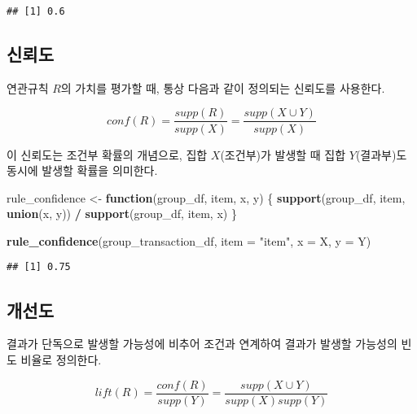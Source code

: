 \documentclass[]{book}
\newenvironment{Shaded}{\begin{snugshade}}{\end{snugshade}}
\newcommand{\ControlFlowTok}[1]{\textcolor[rgb]{0.13,0.29,0.53}{\textbf{#1}}}
\newcommand{\DataTypeTok}[1]{\textcolor[rgb]{0.13,0.29,0.53}{#1}}
\newcommand{\KeywordTok}[1]{\textcolor[rgb]{0.13,0.29,0.53}{\textbf{#1}}}
\newcommand{\NormalTok}[1]{#1}
\newcommand{\OperatorTok}[1]{\textcolor[rgb]{0.81,0.36,0.00}{\textbf{#1}}}
\newcommand{\StringTok}[1]{\textcolor[rgb]{0.31,0.60,0.02}{#1}}
\begin{document}
\begin{verbatim}
## [1] 0.6
\end{verbatim}

\hypertarget{association-rule-confidence}{%
\subsection{신뢰도}\label{association-rule-confidence}}

연관규칙 \(R\)의 가치를 평가할 때, 통상 다음과 같이 정의되는 신뢰도를 사용한다.

\begin{equation*}
conf(R) = \frac{supp(R)}{supp(X)} = \frac{supp(X \cup Y)}{supp(X)}
\end{equation*}

이 신뢰도는 조건부 확률의 개념으로, 집합 \(X\)(조건부)가 발생할 때 집합 \(Y\)(결과부)도 동시에 발생할 확률을 의미한다.

\begin{Shaded}
\begin{Highlighting}[]
\NormalTok{rule_confidence <-}\StringTok{ }\ControlFlowTok{function}\NormalTok{(group_df, item, x, y) \{}
  \KeywordTok{support}\NormalTok{(group_df, item, }\KeywordTok{union}\NormalTok{(x, y)) }\OperatorTok{/}\StringTok{ }\KeywordTok{support}\NormalTok{(group_df, item, x)}
\NormalTok{\}}
\end{Highlighting}
\end{Shaded}

\begin{Shaded}
\begin{Highlighting}[]
\KeywordTok{rule_confidence}\NormalTok{(group_transaction_df, }\DataTypeTok{item =} \StringTok{"item"}\NormalTok{, }\DataTypeTok{x =}\NormalTok{ X, }\DataTypeTok{y =}\NormalTok{ Y)}
\end{Highlighting}
\end{Shaded}

\begin{verbatim}
## [1] 0.75
\end{verbatim}

\hypertarget{association-rule-lift}{%
\subsection{개선도}\label{association-rule-lift}}

결과가 단독으로 발생할 가능성에 비추어 조건과 연계하여 결과가 발생할 가능성의 빈도 비율로 정의한다.

\begin{equation*}
lift(R) = \frac{conf(R)}{supp(Y)} = \frac{supp(X \cup Y)}{supp(X)supp(Y)}
\end{equation*}
\end{document}
